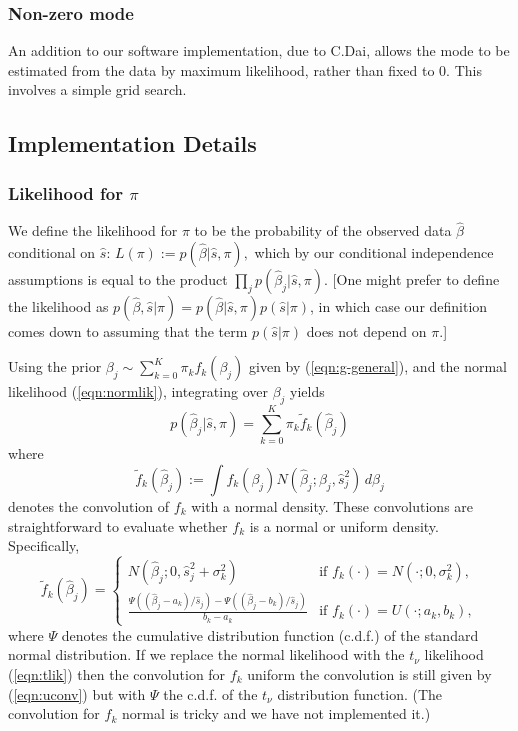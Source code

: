 \documentclass[11pt]{article}
\def\bhat{\hat{\beta}}
\def\shat{\hat{s}}
\begin{document}
\subsubsection*{Non-zero mode}

An addition to our software implementation, due to C.Dai, allows the mode to be estimated from the data by maximum likelihood, rather than fixed to 0.
This involves a simple grid search. 

\subsection*{Implementation Details}

\subsubsection*{Likelihood for $\pi$}

We define the likelihood for $\pi$ to be the probability of the observed data $\bhat$ conditional on $\shat$: $L(\pi) := p(\bhat | \shat,\pi),$ which
by our conditional independence assumptions is equal to the product $\prod_j p(\bhat_j | \shat, \pi)$. [One might prefer to define the likelihood as $p(\bhat, \shat | \pi) = p(\bhat | \shat, \pi) p(\shat | \pi)$, in which case our definition comes down to assuming that the term $p(\shat | \pi)$ does not depend on $\pi$.]

Using the prior $\beta_j \sim \sum_{k=0}^K \pi_k f_k(\beta_j)$ given by (\ref{eqn:g-general}), and the normal likelihood (\ref{eqn:normlik}), integrating over $\beta_j$ yields
\begin{equation}
p(\bhat_j | \shat,\pi)  = \sum_{k=0}^K \pi_k \tilde{f}_k(\bhat_j)
\end{equation}
where 
\begin{equation}
\tilde{f}_k(\bhat_j) := \int f_k(\beta_j) N(\bhat_j; \beta_j,\shat^2_j) \, d\beta_j
\end{equation}
denotes the convolution of $f_k$ with a normal density.
These convolutions are straightforward to evaluate whether $f_k$ is a normal or uniform density.
Specifically, 
\begin{equation} \label{eqn:uconv}
\tilde{f}_k(\bhat_j)  = 
\begin{cases}
N(\bhat_j;0, \shat_j^2 +  \sigma_k^2) & \text{if $f_k(\cdot) = N(\cdot; 0, \sigma_k^2)$}, \\
\frac{\Psi((\bhat_j-a_k)/\shat_j) - \Psi((\bhat_j-b_k)/\shat_j)}{b_k-a_k} & \text{if $f_k(\cdot) = U(\cdot; a_k,b_k)$},
\end{cases}
\end{equation}
where $\Psi$ denotes the cumulative distribution function (c.d.f.) of the standard normal distribution.
If we replace the normal likelihood with the $t_\nu$ likelihood (\ref{eqn:tlik}) then the convolution 
for $f_k$ uniform the convolution is still given by (\ref{eqn:uconv}) but with $\Psi$ the c.d.f. 
of the $t_\nu$ distribution function. (The convolution for $f_k$ normal is tricky and we have not implemented it.)
\end{document}
